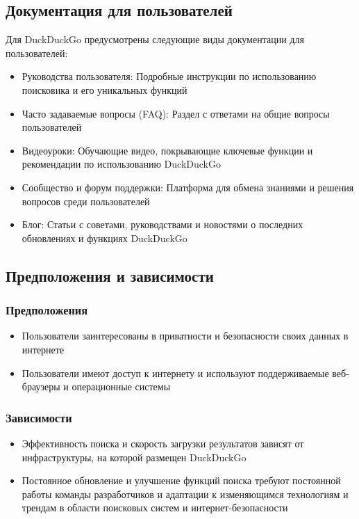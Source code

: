 \documentclass[12pt,a4paper]{article}
\begin{document}
\subsection{Документация для пользователей}
Для DuckDuckGo предусмотрены следующие виды документации для пользователей:
\begin{itemize}
    \item Руководства пользователя: Подробные инструкции по использованию поисковика и его уникальных функций
    \item Часто задаваемые вопросы (FAQ): Раздел с ответами на общие вопросы пользователей
    \item Видеоуроки: Обучающие видео, покрывающие ключевые функции и рекомендации по использованию DuckDuckGo
    \item Сообщество и форум поддержки: Платформа для обмена знаниями и решения вопросов среди пользователей
    \item Блог: Статьи с советами, руководствами и новостями о последних обновлениях и функциях DuckDuckGo
\end{itemize}
\subsection{Предположения и зависимости}
\subsubsection{Предположения}
\begin{itemize}
    \item Пользователи заинтересованы в приватности и безопасности своих данных в интернете
    \item Пользователи имеют доступ к интернету и используют поддерживаемые веб-браузеры и операционные системы
\end{itemize}
\subsubsection{Зависимости}
\begin{itemize}
    \item Эффективность поиска и скорость загрузки результатов зависят от инфраструктуры, на которой размещен DuckDuckGo
    \item Постоянное обновление и улучшение функций поиска требуют постоянной работы команды разработчиков и адаптации к изменяющимся технологиям и трендам в области поисковых систем и интернет-безопасности
\end{itemize}
\end{document}
